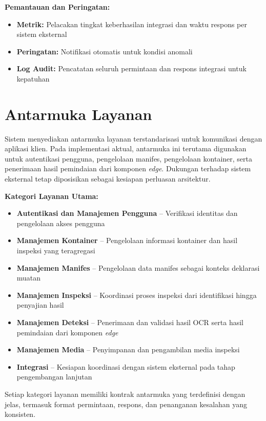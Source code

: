 \textbf{Pemantauan dan Peringatan:}

\begin{itemize}
  \item \textbf{Metrik:} Pelacakan tingkat keberhasilan integrasi dan waktu respons per sistem eksternal
  \item \textbf{Peringatan:} Notifikasi otomatis untuk kondisi anomali
  \item \textbf{Log Audit:} Pencatatan seluruh permintaan dan respons integrasi untuk kepatuhan
\end{itemize}

\section{Antarmuka Layanan}

Sistem menyediakan antarmuka layanan terstandarisasi untuk komunikasi dengan
aplikasi klien. Pada implementasi aktual, antarmuka ini terutama digunakan
untuk autentikasi pengguna, pengelolaan manifes, pengelolaan kontainer, serta
penerimaan hasil pemindaian dari komponen \textit{edge}. Dukungan terhadap
sistem eksternal tetap diposisikan sebagai kesiapan perluasan arsitektur.

\textbf{Kategori Layanan Utama:}

\begin{itemize}
  \item \textbf{Autentikasi dan Manajemen Pengguna} -- Verifikasi identitas dan pengelolaan akses pengguna
  \item \textbf{Manajemen Kontainer} -- Pengelolaan informasi kontainer dan hasil inspeksi yang teragregasi
  \item \textbf{Manajemen Manifes} -- Pengelolaan data manifes sebagai konteks deklarasi muatan
  \item \textbf{Manajemen Inspeksi} -- Koordinasi proses inspeksi dari identifikasi hingga penyajian hasil
  \item \textbf{Manajemen Deteksi} -- Penerimaan dan validasi hasil OCR serta hasil pemindaian dari komponen \textit{edge}
  \item \textbf{Manajemen Media} -- Penyimpanan dan pengambilan media inspeksi
  \item \textbf{Integrasi} -- Kesiapan koordinasi dengan sistem eksternal pada tahap pengembangan lanjutan
\end{itemize}

Setiap kategori layanan memiliki kontrak antarmuka yang terdefinisi dengan jelas, termasuk format permintaan, respons, dan penanganan kesalahan yang konsisten.

